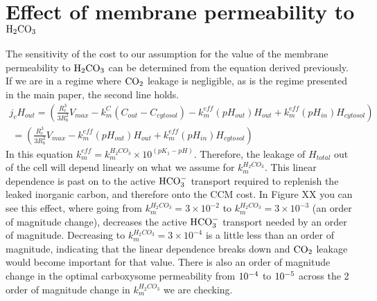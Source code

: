 \documentclass[]{article}
\begin{document}
\section{Effect of membrane permeability to ${\rm H_2CO_3}$}

The sensitivity of the cost to our assumption for the value of the membrane permeability to  ${\rm H_2CO_3}$ can be determined from the equation derived previously. If we are in a regime where ${\rm CO_2}$ leakage is negligible, as is the regime presented in the main paper, the second line holds. 
\begin{multline}
j_c H_{out} =  \left(\frac{R_c^3}{3 R_b^2}  V_{max}  -k_m^C \left( C_{out} - C_{cytosol} \right) -k_m^{eff}(pH_{out}) H_{out} +k_m^{eff}(pH_{in})  H_{cytosol} \right) \\ 
\; = \left(\frac{R_c^3}{3 R_b^2}  V_{max}  - k_m^{eff}(pH_{out}) H_{out} + k_m^{eff}(pH_{in}) H_{cytosol} \right)
\end{multline}
In this equation $k_m^{eff} = k_m^{H_2CO_3} \times 10^{(pK_1 - pH)}$. Therefore, the leakage of ${H_{total}}$ out of the cell will depend linearly on what we assume for $ k_m^{H_2CO_3}$. This linear dependence is past on to the active ${\rm HCO_3^-}$ transport required to replenish the leaked inorganic carbon, and therefore onto the CCM cost. In Figure XX you can see this effect, where going from $ k_m^{H_2CO_3} = 3\times10^{-2}$ to $ k_m^{H_2CO_3} = 3\times10^{-3}$ (an order of magnitude change), decreases the active ${\rm HCO_3^-}$ transport needed by an order of magnitude. Decreasing  to $ k_m^{H_2CO_3} = 3\times10^{-4}$ is a little less than an order of magnitude, indicating that the linear dependence breaks down and ${\rm CO_2}$ leakage would become important for that value. There is also an order of magnitude change in the optimal carboxysome permeability from ${\rm 10^{-4}}$ to ${\rm 10^{-5}}$ across the 2 order of magnitude change in $ k_m^{H_2CO_3}$ we are checking.
\end{document}
